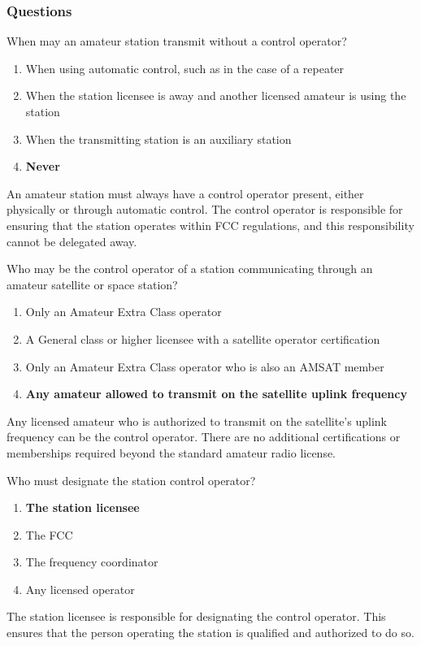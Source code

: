 \subsubsection{Questions}

\begin{tcolorbox}[colback=gray!10!white,colframe=black!75!black,title={T1E01}]
    When may an amateur station transmit without a control operator?
    \begin{enumerate}[label=\Alph*),noitemsep]
        \item When using automatic control, such as in the case of a repeater
        \item When the station licensee is away and another licensed amateur is using the station
        \item When the transmitting station is an auxiliary station
        \item \textbf{Never}
    \end{enumerate}
\end{tcolorbox}
An amateur station must always have a control operator present, either physically or through automatic control. The control operator is responsible for ensuring that the station operates within FCC regulations, and this responsibility cannot be delegated away.

\begin{tcolorbox}[colback=gray!10!white,colframe=black!75!black,title={T1E02}]
    Who may be the control operator of a station communicating through an amateur satellite or space station?
    \begin{enumerate}[label=\Alph*),noitemsep]
        \item Only an Amateur Extra Class operator
        \item A General class or higher licensee with a satellite operator certification
        \item Only an Amateur Extra Class operator who is also an AMSAT member
        \item \textbf{Any amateur allowed to transmit on the satellite uplink frequency}
    \end{enumerate}
\end{tcolorbox}
Any licensed amateur who is authorized to transmit on the satellite's uplink frequency can be the control operator. There are no additional certifications or memberships required beyond the standard amateur radio license.

\begin{tcolorbox}[colback=gray!10!white,colframe=black!75!black,title={T1E03}]
    Who must designate the station control operator?
    \begin{enumerate}[label=\Alph*),noitemsep]
        \item \textbf{The station licensee}
        \item The FCC
        \item The frequency coordinator
        \item Any licensed operator
    \end{enumerate}
\end{tcolorbox}
The station licensee is responsible for designating the control operator. This ensures that the person operating the station is qualified and authorized to do so.

